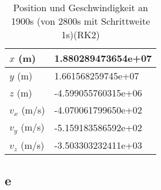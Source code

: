\begin{table}[htbp]\centering
	\begin{tabular}{|l|l|}
		\hline
		$x$ (m)     & 1.880289473654e+07  \\ \hline
		$y$ (m)     & 1.661568259745e+07  \\ \hline
		$z$ (m)     & -4.599055760315e+06 \\ \hline
		$v_x$ (m/s) & -4.070061799650e+02 \\ \hline
		$v_y$ (m/s) & -5.159183586592e+02 \\ \hline
		$v_z$ (m/s) & -3.503303232411e+03 \\ \hline
	\end{tabular}
	\caption{Position und Geschwindigkeit an 1900s (von 2800s mit Schrittweite 1s)(RK2)}
\end{table}
\subsection{e}
